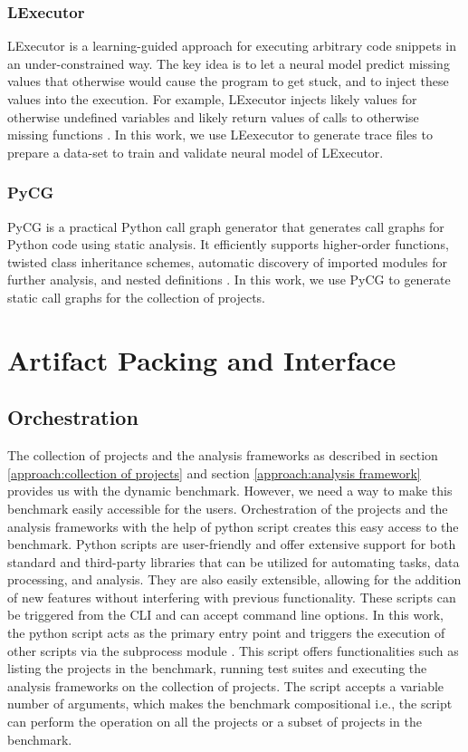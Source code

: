 \subsubsection{LExecutor}
LExecutor is a learning-guided approach for executing arbitrary code snippets in an under-constrained way.
The key idea is to let a neural model predict missing values that otherwise would cause the program to get stuck, and to inject these values into the execution.
For example, LExecutor injects likely values for otherwise undefined variables and likely return values of calls to otherwise missing functions \cite{LExecutor_2023}. 
In this work, we use LEexecutor to generate trace files to prepare a data-set to train and validate neural model of LExecutor.
\subsubsection{PyCG}
PyCG is a practical Python call graph generator that generates call graphs for Python code using static analysis.
It efficiently supports higher-order functions, twisted class inheritance schemes, automatic discovery of imported modules for further analysis, and nested definitions \cite{PyCG_2021}.
In this work, we use PyCG to generate static call graphs for the collection of projects.

\section{Artifact Packing and Interface}
\label{approach:artifact packaging and interface}

\subsection{Orchestration}
\label{approach:python script}
The collection of projects and the analysis frameworks as described in section \ref{approach:collection of projects} and section \ref{approach:analysis framework} provides us with the dynamic benchmark. 
However, we need a way to make this benchmark easily accessible for the users.
Orchestration of the projects and the analysis frameworks with the help of python script creates this easy access to the benchmark.
Python scripts are user-friendly and offer extensive support for both standard and third-party libraries that can be utilized for automating tasks, data processing, and analysis.
They are also easily extensible, allowing for the addition of new features without interfering with previous functionality.
These scripts can be triggered from the CLI and can accept command line options.
In this work, the python script acts as the primary entry point and triggers the execution of other scripts via the subprocess module \cite{python_subprocess}.
This script offers functionalities such as listing the projects in the benchmark, running test suites and executing the analysis frameworks on the collection of projects.  
The script accepts a variable number of arguments, which makes the benchmark compositional i.e., the script can perform the operation on all the projects or a subset of projects in the benchmark. 

